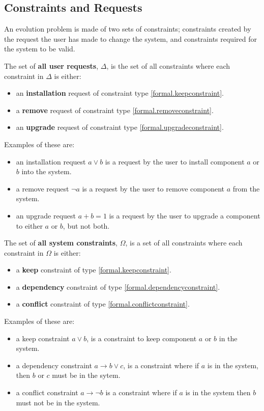 \subsection{Constraints and Requests}
\label{formal.constraints}
An evolution problem is made of two sets of constraints; constraints created by the request the user has made to change the system, 
and constraints required for the system to be valid.

\begin{defs}
The set of \textbf{all user requests}, $\Delta$, is the set of all constraints where each constraint in $\Delta$ is either:
\begin{itemize}
  \item an \textbf{installation} request of constraint type \ref{formal.keepconstraint}.
  \item a \textbf{remove} request of constraint type \ref{formal.removeconstraint}.
  \item an \textbf{upgrade} request of constraint type \ref{formal.upgradeconstraint}.
\end{itemize}
\end{defs}
Examples of these are:
\begin{itemize}
  \item an installation request $a \vee b$ is a request by the user to install component $a$ or $b$ into the system.
  \item a remove request $\neg a$ is a request by the user to remove component $a$ from the system.
  \item an upgrade request $a + b = 1$ is a request by the user to upgrade a component to either $a$ or $b$, but not both.
\end{itemize} 



\begin{defs}
The set of \textbf{all system constraints}, $\Omega$, is a set of all constraints where each constraint in $\Omega$ is either: 
\begin{itemize}
  \item a \textbf{keep} constraint of type \ref{formal.keepconstraint}.
  \item a \textbf{dependency} constraint of type \ref{formal.dependencyconstraint}.
  \item a \textbf{conflict} constraint of type \ref{formal.conflictconstraint}.
\end{itemize}
\end{defs}
Examples of these are:
\begin{itemize}
  \item a keep constraint $a \vee b$, is a constraint to keep component $a$ or $b$ in the system.
  \item a dependency constraint  $a \rightarrow b \vee c$, is a constraint where if $a$ is in the system, then $b$ or $c$ must be in the sytem.
  \item a conflict constraint $a \rightarrow \neg b$ is a constraint where if $a$ is in the system then $b$ must not be in the system.
\end{itemize} 

